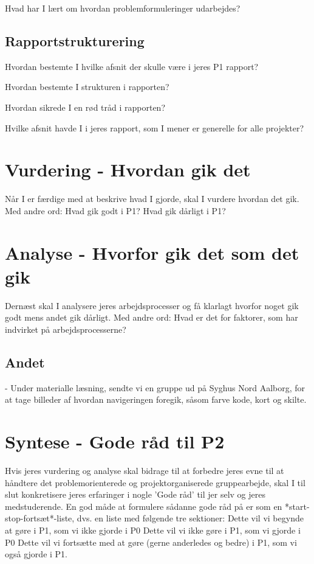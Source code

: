 \documentclass[a4paper,12pt,twoside,openright]{memoir}
\begin{document}
Hvad har I lært om hvordan problemformuleringer udarbejdes?\newline

        \subsection{Rapportstrukturering}

Hvordan bestemte I hvilke afsnit der skulle være i jeres P1 rapport?\newline

Hvordan bestemte I strukturen i rapporten?\newline

Hvordan sikrede I en rød tråd i rapporten?\newline

Hvilke afsnit havde I i jeres rapport, som I mener er generelle for alle projekter?\newline

    \section{Vurdering - Hvordan gik det}

Når I er færdige med at beskrive hvad I gjorde, skal I vurdere hvordan det gik. Med andre ord: Hvad gik godt i P1? Hvad gik dårligt i P1? \newline

    \section{Analyse - Hvorfor gik det som det gik}

Dernæst skal I analysere jeres arbejdsprocesser og få klarlagt hvorfor noget gik godt mens andet gik dårligt. Med andre ord: Hvad er det for faktorer, som har indvirket på arbejdsprocesserne? \newline

        
        \subsection{Andet}
- Under materialle læsning, sendte vi en gruppe ud på Syghus Nord Aalborg, for at tage billeder af hvordan navigeringen foregik, såsom farve kode, kort og skilte.\newline

    \section{Syntese - Gode råd til P2}

Hvis jeres vurdering og analyse skal bidrage til at forbedre jeres evne til at håndtere det problemorienterede og projektorganiserede gruppearbejde, skal I til slut konkretisere jeres erfaringer i nogle ’Gode råd’ til jer selv og jeres medstuderende. En god måde at formulere sådanne gode råd på er som en *start-stop-fortsæt*-liste, dvs. en liste med følgende tre sektioner: Dette vil vi begynde at gøre i P1, som vi ikke gjorde i P0 Dette vil vi ikke gøre i P1, som vi gjorde i P0 Dette vil vi fortsætte med at gøre (gerne anderledes og bedre) i P1, som vi også gjorde i P1.\newline
\end{document}
